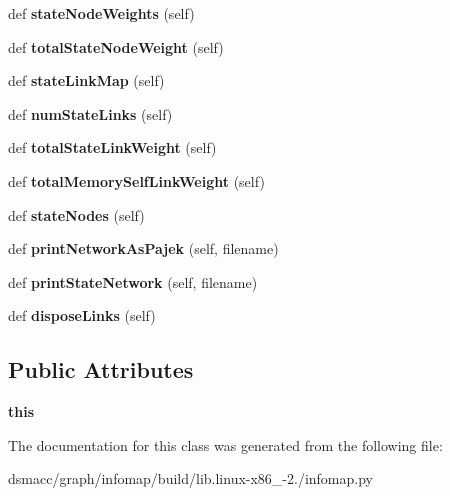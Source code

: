 \begin{DoxyCompactItemize}
def {\bfseries state\+Node\+Weights} (self)
\item 
\mbox{\label{classinfomap_1_1MemNetwork_a835ac0f9638da748662476bc9d8d39c1}} 
def {\bfseries total\+State\+Node\+Weight} (self)
\item 
\mbox{\label{classinfomap_1_1MemNetwork_a8e5145d05488839abdc91ef61025def7}} 
def {\bfseries state\+Link\+Map} (self)
\item 
\mbox{\label{classinfomap_1_1MemNetwork_aa53909de3f6142dc22ef555961571b52}} 
def {\bfseries num\+State\+Links} (self)
\item 
\mbox{\label{classinfomap_1_1MemNetwork_af47eab13c96de09f7481f49b9c9e1e8e}} 
def {\bfseries total\+State\+Link\+Weight} (self)
\item 
\mbox{\label{classinfomap_1_1MemNetwork_aa3b697b179ffdc72c407e24486c3da0b}} 
def {\bfseries total\+Memory\+Self\+Link\+Weight} (self)
\item 
\mbox{\label{classinfomap_1_1MemNetwork_a2bdad7299ac87d08df32c3bcfe7a3197}} 
def {\bfseries state\+Nodes} (self)
\item 
\mbox{\label{classinfomap_1_1MemNetwork_ad075b83477f6c1a256d16d6dca873173}} 
def {\bfseries print\+Network\+As\+Pajek} (self, filename)
\item 
\mbox{\label{classinfomap_1_1MemNetwork_aea063d376f1d8117d8d600bdc86888dd}} 
def {\bfseries print\+State\+Network} (self, filename)
\item 
\mbox{\label{classinfomap_1_1MemNetwork_a87c20fe7da49655b1505bd859fd84ed8}} 
def {\bfseries dispose\+Links} (self)
\end{DoxyCompactItemize}
\subsection*{Public Attributes}
\begin{DoxyCompactItemize}
\item 
\mbox{\label{classinfomap_1_1MemNetwork_ab745cc391e90e944e1c3c274f60f6297}} 
{\bfseries this}
\end{DoxyCompactItemize}


The documentation for this class was generated from the following file\+:\begin{DoxyCompactItemize}
\item 
dsmacc/graph/infomap/build/lib.\+linux-\/x86\+\_-\/2./infomap.\+py\end{DoxyCompactItemize}
